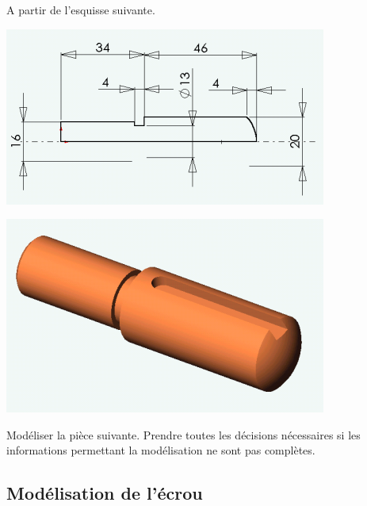 \begin{minipage}{0.4\linewidth}
A partir de l'esquisse suivante.
\end{minipage}
\hfill
\begin{minipage}{0.58\linewidth}
\includegraphics[width=0.9\linewidth]{img/025}
\end{minipage}

\begin{minipage}{0.3\linewidth}
\includegraphics[width=0.9\linewidth]{img/024}
\end{minipage}
\hfill
\begin{minipage}{0.68\linewidth}
Modéliser la pièce suivante. Prendre toutes les décisions nécessaires si les informations permettant la modélisation ne sont pas complètes.
\end{minipage}

\subsection{Modélisation de l'écrou}

